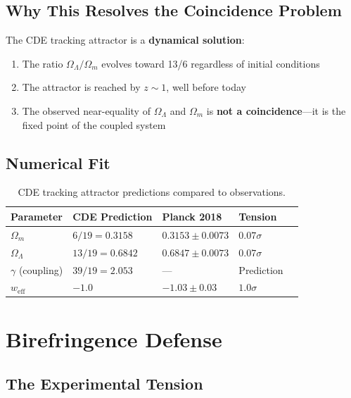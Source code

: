 \documentclass[11pt,a4paper]{article}
\theoremstyle{plain}
\theoremstyle{definition}
\theoremstyle{remark}
\begin{document}
\subsection{Why This Resolves the Coincidence Problem}

The CDE tracking attractor is a \textbf{dynamical solution}:
\begin{enumerate}
  \item The ratio $\Omega_\Lambda/\Omega_m$ evolves toward 13/6 regardless of initial conditions
  \item The attractor is reached by $z \sim 1$, well before today
  \item The observed near-equality of $\Omega_\Lambda$ and $\Omega_m$ is \textbf{not a coincidence}---it is the fixed point of the coupled system
\end{enumerate}

\subsection{Numerical Fit}

\begin{table}[h!]
\centering
\begin{tabular}{lllll}
\toprule
\textbf{Parameter} & \textbf{CDE Prediction} & \textbf{Planck 2018} & \textbf{Tension} \\
\midrule
$\Omega_m$ & $6/19 = 0.3158$ & $0.3153 \pm 0.0073$ & $0.07\sigma$ \\
$\Omega_\Lambda$ & $13/19 = 0.6842$ & $0.6847 \pm 0.0073$ & $0.07\sigma$ \\
$\gamma$ (coupling) & $39/19 = 2.053$ & --- & Prediction \\
$w_{\text{eff}}$ & $-1.0$ & $-1.03 \pm 0.03$ & $1.0\sigma$ \\
\bottomrule
\end{tabular}
\caption{CDE tracking attractor predictions compared to observations.}
\end{table}

\section{Birefringence Defense}
\label{sec:birefringence}

\subsection{The Experimental Tension}
\end{document}
